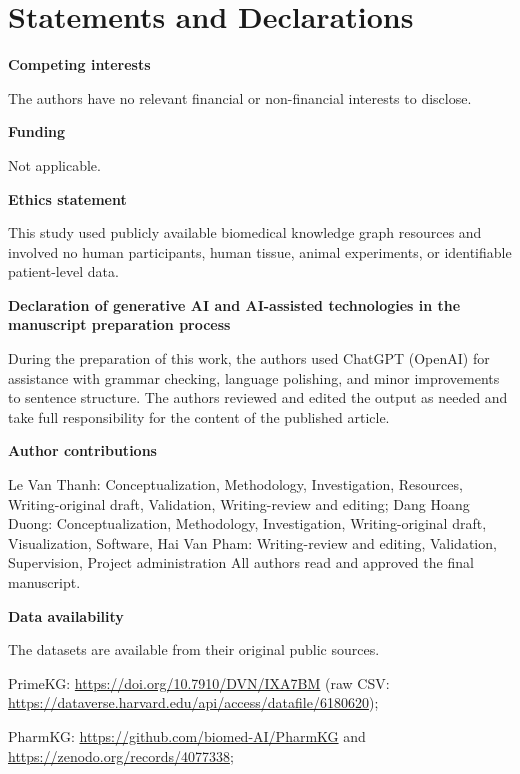 \documentclass[pdflatex,sn-mathphys-num]{sn-jnl}
\begin{document}
\section*{Statements and Declarations}

\noindent\textbf{Competing interests}\par
\noindent The authors have no relevant financial or non-financial interests to disclose.\par\smallskip

\noindent\textbf{Funding}\par
\noindent Not applicable.\par\smallskip

\noindent\textbf{Ethics statement}\par
\noindent This study used publicly available biomedical knowledge graph resources and involved no human participants, human tissue, animal experiments, or identifiable patient-level data.\par\smallskip

\noindent\textbf{Declaration of generative AI and AI-assisted technologies in the manuscript preparation process}\par\nobreak
\noindent During the preparation of this work, the authors used ChatGPT (OpenAI) for assistance with grammar checking, language polishing, and minor improvements to sentence structure. The authors reviewed and edited the output as needed and take full responsibility for the content of the published article. \par\smallskip

\noindent\textbf{Author contributions}\par
\noindent Le Van Thanh: Conceptualization, Methodology, Investigation, Resources, Writing-original draft, Validation, Writing-review and editing; Dang Hoang Duong: Conceptualization, Methodology, Investigation, Writing-original draft, Visualization, Software, Hai Van Pham: Writing-review and editing, Validation, Supervision, Project administration All authors read and approved the final manuscript.\par\smallskip

\noindent\textbf{Data availability}\par
\noindent The datasets are available from their original public sources. 

PrimeKG: \url{https://doi.org/10.7910/DVN/IXA7BM} (raw CSV: \url{https://dataverse.harvard.edu/api/access/datafile/6180620}); 

PharmKG: \url{https://github.com/biomed-AI/PharmKG} and \url{https://zenodo.org/records/4077338}; 
\end{document}
